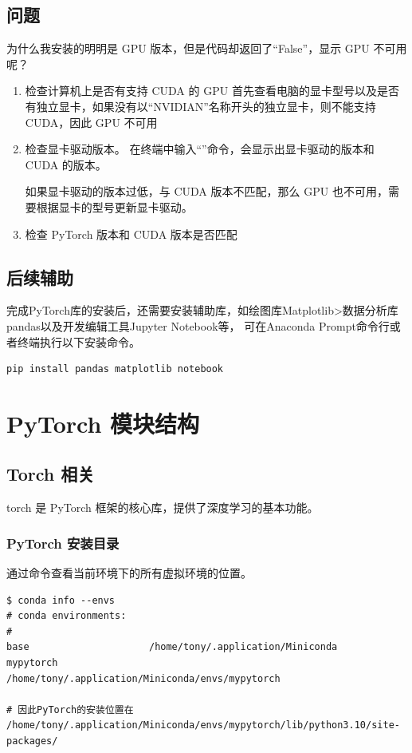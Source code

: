 \subsection{问题}
为什么我安装的明明是 GPU 版本，但是代码却返回了“False”，显示 GPU 不可用呢？
\begin{enumerate}[label=\arabic*)]
    \item 检查计算机上是否有支持 CUDA 的 GPU
    首先查看电脑的显卡型号以及是否有独立显卡，如果没有以“NVIDIAN”名称开头的独立显卡，则不能支持 CUDA，因此 GPU 不可用

    \item 检查显卡驱动版本。
    在终端中输入“”命令，会显示出显卡驱动的版本和 CUDA 的版本。

    如果显卡驱动的版本过低，与 CUDA 版本不匹配，那么 GPU 也不可用，需要根据显卡的型号更新显卡驱动。

    \item 检查 PyTorch 版本和 CUDA 版本是否匹配
    
\end{enumerate}

\subsection{后续辅助}
完成PyTorch库的安装后，还需要安装辅助库，如绘图库Matplotlib>数据分析库 pandas以及开发编辑工具Jupyter Notebook等，
可在Anaconda Prompt命令行或者终端执行以下安装命令。
\begin{lstlisting}[style=demostyle,numbers=none]
pip install pandas matplotlib notebook
\end{lstlisting}


\section{PyTorch 模块结构}
\subsection{Torch 相关}
torch 是 PyTorch 框架的核心库，提供了深度学习的基本功能。

\subsubsection{PyTorch 安装目录}
通过命令查看当前环境下的所有虚拟环境的位置。
\begin{lstlisting}[style=demostyle,numbers=none]
$ conda info --envs
# conda environments:
#
base                     /home/tony/.application/Miniconda
mypytorch                /home/tony/.application/Miniconda/envs/mypytorch

# 因此PyTorch的安装位置在
/home/tony/.application/Miniconda/envs/mypytorch/lib/python3.10/site-packages/
\end{lstlisting}

